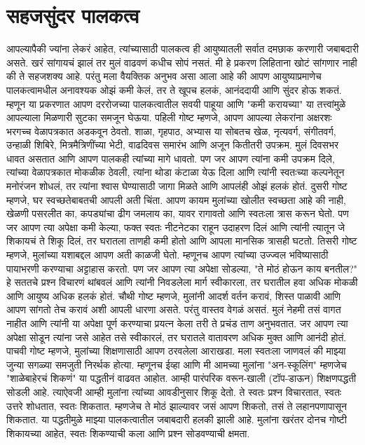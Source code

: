 \chapter{सहजसुंदर पालकत्व}
आपल्यापैकी ज्यांना लेकरं आहेत, त्यांच्यासाठी पालकत्व ही आयुष्यातली सर्वात दमछाक करणारी जबाबदारी असते. खरं सांगायचं झालं तर मुलं वाढवणं कधीच सोपं नसतं. मी हे प्रकरण लिहिताना खोटं सांगणार नाही की ते सहजशक्य आहे.
परंतु मला वैयक्तिक अनुभव असा आला आहे की आपण आयुष्याप्रमाणेच पालकत्वामधील अनावश्यक ओझं कमी केलं, तर ते खूपच हलकं, आनंददायी आणि सुंदर होऊ शकतं. म्हणून या प्रकरणात आपण दररोजच्या पालकत्वातील सवयी पाहूया आणि "कमी करायच्या" या तत्त्वांमुळे आपल्याला मिळणारी सुटका समजून घेऊया.
पहिली गोष्ट म्हणजे, आपण आपल्या लेकरांना अक्षरशः भरगच्च वेळापत्रकात अडकवून ठेवतो. शाळा, गृहपाठ, अभ्यास या सोबतच खेळ, नृत्यवर्ग, संगीतवर्ग, उन्हाळी शिबिरे, मित्रमैत्रिणींच्या भेटी, वाढदिवस समारंभ आणि अजून कितीतरी उपक्रम. मुलं दिवसभर धावत असतात आणि आपण पालकही त्यांच्या मागे धावतो. पण जर आपण त्यांना कमी उपक्रम दिले, त्यांच्या वेळापत्रकात मोकळीक ठेवली, त्यांना थोडा कंटाळा येऊ दिला आणि त्यांनी स्वतःच्या कल्पनेतून मनोरंजन शोधलं, तर त्यांना श्वास घेण्यासाठी जागा मिळते आणि आपलंही ओझं हलकं होतं.
दुसरी गोष्ट म्हणजे, घर स्वच्छतेबाबतची आपली अती चिंता. आपण कायम मुलांच्या खोलीत स्वच्छता आहे की नाही, खेळणी पसरलीत का, कपड्यांचा ढीग जमलाय का, यावर रागावतो आणि स्वतःला त्रास करून घेतो. पण जर आपण त्या अपेक्षा कमी केल्या, फक्त स्वतः नीटनेटका राहून उदाहरण दिलं आणि त्यांनी त्यातून जे शिकायचं ते शिकू दिलं, तर घरातला ताणही कमी होतो आणि आपला मानसिक त्रासही घटतो.
तिसरी गोष्ट म्हणजे, मुलांच्या यशाबद्दल आपण अती काळजी घेतो. म्हणूनच आपण त्यांच्या उज्ज्वल भविष्यासाठी पायाभरणी करण्याचा अट्टाहास करतो. पण जर आपण त्या अपेक्षा सोडल्या, "ते मोठं होऊन काय बनतील?" हे सततचे प्रश्न विचारणं थांबवलं आणि त्यांनी निवडलेला मार्ग स्वीकारला, तर घरातील हवा अधिक मोकळी आणि आयुष्य अधिक हलकं होतं.
चौथी गोष्ट म्हणजे, मुलांनी आदर्श वर्तन करावं, शिस्त पाळावी आणि आपण सांगतो तेच करावं अशी आपली धारणा असते. परंतु वास्तव वेगळं असतं. मुलं नेहमी तसं वागत नाहीत आणि त्यांनी या अपेक्षा पूर्ण करण्याचा प्रयत्न केला तरी ते प्रचंड ताण अनुभवतात. जर आपण त्या अपेक्षा सोडून त्यांना जसे आहेत तसे स्वीकारलं, तर घरातले वातावरण अधिक मुक्त आणि आनंदी होतं.
पाचवी गोष्ट म्हणजे, मुलांच्या शिक्षणासाठी आपण ठरवलेला आराखडा. मला स्वतःला जाणवलं की माझ्या जुन्या सगळ्या समजुती निरर्थक होत्या. म्हणूनच ईव्हा आणि मी आमच्या मुलांना "अन-स्कूलिंग" म्हणजेच "शाळेबाहेरचं शिकणं" या पद्धतीनं वाढवत आहोत. आम्ही पारंपरिक वरून-खाली (टॉप-डाऊन) शिक्षणपद्धती सोडली आहे. त्याऐवजी आम्ही मुलांना त्यांच्या आवडीनुसार शिकू देतो. ते स्वतः प्रश्न विचारतात, स्वतः उत्तरे शोधतात, स्वतः शिकतात. म्हणजेच ते मोठं झाल्यावर जसं आपण शिकतो, तसं ते लहानपणापासून शिकतात. या पद्धतीमुळे माझ्या पालकत्वातील जबाबदारी हलकी झाली आहे. मुलांना खरंतर दोनच गोष्टी शिकायच्या आहेत, स्वतः शिकण्याची कला आणि प्रश्न सोडवण्याची क्षमता.

